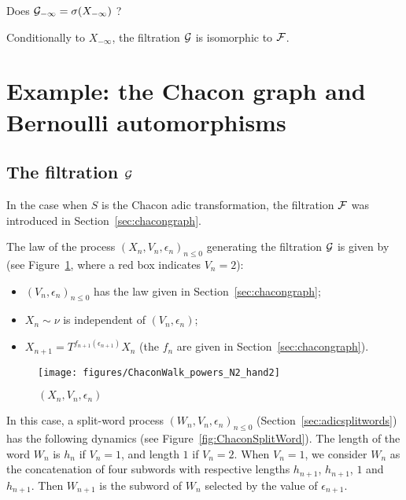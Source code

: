 \documentclass[12pt,a4paper]{article}
\begin{document}
\begin{question}
Does $\mathcal{G}_{-\infty} = \sigma(X_{-\infty})$ ? 
\end{question}

\begin{clarify}
Conditionally to $X_{-\infty}$, the filtration $\mathcal{G}$ is isomorphic to $\mathcal{F}$.  
\end{clarify}


\section{Example: the Chacon graph and Bernoulli automorphisms}

\subsection{The filtration $\mathcal{G}$}

In the case when $S$ is the Chacon adic transformation, the 
filtration $\mathcal{F}$ was introduced in Section~\ref{sec:chacongraph}. 

The law of the process ${(X_n, V_n, \epsilon_n)}_{n \leq 0}$ generating the 
filtration $\mathcal{G}$ is given by (see Figure~\ref{fig:ChaconPowers}, where a red box 
indicates $V_n=2$):

\begin{itemize}
\item ${(V_n, \epsilon_n)}_{n \leq 0}$ has the law given in Section~\ref{sec:chacongraph};

\item $X_n \sim \nu$ is independent of $(V_n, \epsilon_n)$;

\item $X_{n+1} = T^{f_{n+1}(\epsilon_{n+1})}X_n$ (the $f_n$ are given in Section~\ref{sec:chacongraph}).
\end{itemize}

\begin{figure}[!h]
\centering
	\texttt{[image: figures/ChaconWalk\_powers\_N2\_hand2]}
\caption{$(X_n, V_n, \epsilon_n)$}
\label{fig:ChaconPowers}
\end{figure}


In this case, a split-word process ${(W_n, V_n, \epsilon_n)}_{n \leq 0}$ 
(Section~\ref{sec:adicsplitwords})  
has the following dynamics (see Figure~\ref{fig:ChaconSplitWord}). 
The length of the word $W_n$ is $h_n$ if $V_n=1$, and length $1$ if $V_n=2$. 
When $V_n=1$, we consider $W_n$ as the concatenation of four subwords 
with respective lengths $h_{n+1}$, $h_{n+1}$, $1$ and $h_{n+1}$. 
Then $W_{n+1}$ is the subword of $W_n$ selected by the value of $\epsilon_{n+1}$. 
\end{document}
